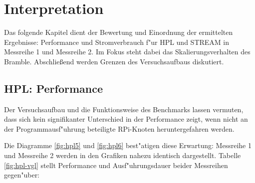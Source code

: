 \chapter{Interpretation}\label{Kap4}

Das folgende Kapitel dient der Bewertung und Einordnung der ermittelten Ergebnisse: Performance und Stromverbrauch f"ur HPL und STREAM in Messreihe 1 und Messreihe 2. Im Fokus steht dabei das Skalierungsverhalten des Bramble. Abschlie\ss end werden Grenzen des Versuchsaufbaus diskutiert.   

\section{HPL: Performance}\label{Interpretation-Linpack}


Der Versuchsaufbau und die Funktionsweise des Benchmarks lassen vermuten, dass sich kein signifikanter Unterschied in der Performance zeigt, wenn nicht an der Programmausf"uhrung beteiligte RPi-Knoten heruntergefahren werden. 

Die Diagramme \ref{fig:hpl5} und \ref{fig:hpl6} best"atigen diese Erwartung: Messreihe 1 und Messreihe 2 werden in den Grafiken nahezu identisch dargestellt. Tabelle \ref{fig:hpl-vgl} stellt Performance und Ausf"uhrungsdauer beider Messreihen gegen"uber: 

